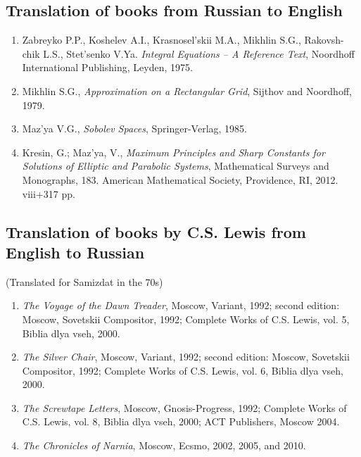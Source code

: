 \documentclass{article}
\begin{document}
\subsection*{Translation of books from Russian to English}


\begin{enumerate}
\item Zabreyko P.P., Koshelev A.I., Krasnosel'skii M.A., Mikhlin
S.G., Rakovsh- chik L.S., Stet'senko V.Ya. {\it Integral
Equations -- A Reference Text}, Noordhoff International Publishing,
Leyden, 1975.

\item Mikhlin S.G., {\it Approximation on a Rectangular Grid},
Sijthov and Noordhoff, 1979.

\item Maz'ya V.G., {\it Sobolev Spaces}, Springer-Verlag, 1985.


\item Kresin, G.; Maz'ya, V., {\it  Maximum Principles and Sharp Constants for Solutions of Elliptic and Parabolic Systems},  Mathematical Surveys and Monographs, 183. American Mathematical Society, Providence, RI, 2012. viii+317 pp.
\end{enumerate}

\subsection*{Translation of books by C.S. Lewis from English to
Russian}

\centerline{(Translated for Samizdat in the 70s)}

\begin{enumerate}
\item {\it The Voyage of the Dawn Treader}, Moscow, Variant, 1992;
second edition: Moscow, Sovetskii Compositor, 1992;
Complete Works of C.S. Lewis, vol. 5, Biblia dlya vseh, 2000.

\item {\it The Silver Chair}, Moscow, Variant, 1992; second edition:
Moscow, Sovetskii Compositor, 1992;
Complete Works of C.S. Lewis, vol. 6, Biblia dlya vseh, 2000.

\item {\it The Screwtape Letters}, Moscow, Gnosis-Progress, 1992;
Complete Works of C.S. Lewis, vol. 8, Biblia dlya vseh, 2000; ACT Publishers, Moscow 2004.

\item {\it The Chronicles of Narnia}, Moscow, Ecsmo, 2002,  2005, and 2010. 
\end{enumerate}
\end{document}
